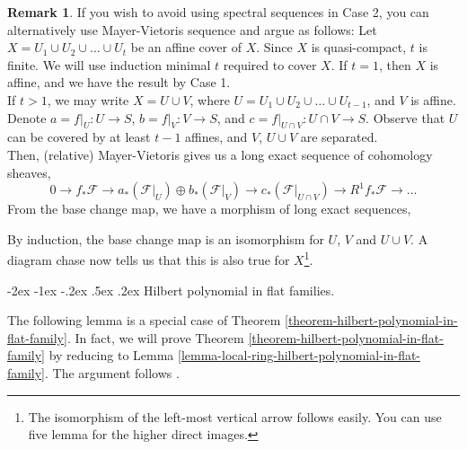\documentclass[11pt]{amsart}
\makeatletter
\renewcommand\subsection{\@startsection {subsection}{1}{\z@}%
	{-2ex \@plus -1ex \@minus -.2ex}%
	{.5ex \@plus.2ex}%
	{\normalfont\bfseries}}
\theoremstyle{definition}
\newtheorem{remark}[theorem]{Remark}
\makeatother
\begin{document}
\begin{remark}
	If you wish to avoid using spectral sequences in Case 2, you can alternatively use Mayer-Vietoris sequence and argue as follows:
	Let $X=U_1\cup U_2 \cup \ldots \cup U_t$ be an affine cover of $X$. Since $X$ is quasi-compact, $t$ is finite. We will use induction minimal $t$ required to cover $X$. If $t=1$, then $X$ is affine, and we have the result by Case 1. \\
	If $t>1$, we may write $X=U\cup V$, where $U=U_1\cup U_2 \cup \ldots \cup U_{t-1}$, and $V$ is affine. Denote $a = f|_U : U \to S$, $b = f|_V : V \to S$, and $c = f|_{U \cap V} : U \cap V \to S$. Observe that $U$ can be covered by at least $t-1$ affines, and $V$, $U\cup V$ are separated.\\
	Then, (relative) Mayer-Vietoris \cite[Tag 01EC]{stacks-project} gives us a long exact sequence of cohomology sheaves,
	\[0 \rightarrow
	f_*\mathcal{F} \rightarrow
	a_*(\mathcal{F}|_U) \oplus b_*(\mathcal{F}|_V) \rightarrow
	c_*(\mathcal{F}|_{U \cap V}) \rightarrow
	R^1f_*\mathcal{F} \to \ldots
	\]
	From the base change map, we have a morphism of long exact sequences,
	\begin{center}
	\end{center}
	By induction, the base change map is an isomorphism for $U$, $V$ and $U\cup V$. A diagram chase now tells us that this is also true for $X$\footnote{The isomorphism of the left-most vertical arrow follows easily. You can use five lemma for the higher direct images.}.
\end{remark}


\subsection{Hilbert polynomial in flat families.}

The following lemma is a special case of Theorem \ref{theorem-hilbert-polynomial-in-flat-family}. In fact, we will prove Theorem \ref{theorem-hilbert-polynomial-in-flat-family} by reducing to Lemma \ref{lemma-local-ring-hilbert-polynomial-in-flat-family}. The argument follows \cite[III, 9.8]{Hart1}.
\end{document}
